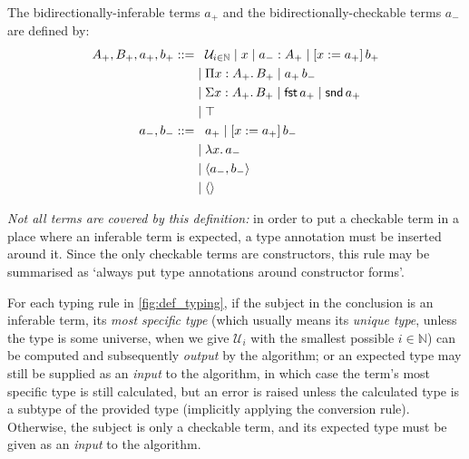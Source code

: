 \documentclass[twoside]{report}
\begin{document}
\begin{definition}
    \label{def:bidirectional_terms}
    The bidirectionally-inferable terms $a_+$ and the bidirectionally-checkable terms $a_-$ are defined by: $$
        \begin{aligned}
            A_+,B_+,a_+,b_+ ::=
             & \phantom{{}\mid{}} \mathcal U_{i \in \mathbb N} \mid x \mid {a_-} : {A_+} \mid \llet x {a_+} {b_+} \\
             & \mid \ppi x {A_+} {B_+} \mid \app {a_+} {b_-}                                                      \\
             & \mid \sig x {A_+} {B_+} \mid \fst {a_+} \mid \snd {a_+}                                            \\
             & \mid \unit                                                                                         \\
            a_-,b_- ::=
             & \phantom{{}\mid{}} a_+ \mid \llet x {a_+} {b_-}                                                    \\
             & \mid \lam x {a_-}                                                                                  \\
             & \mid \pair {a_-} {b_-}                                                                             \\
             & \mid \sstar                                                                                        \\
        \end{aligned}
    $$
\end{definition}

\emph{Not all terms are covered by this definition:} in order to put a checkable term in a place where an inferable term is expected, a type annotation must be inserted around it. Since the only checkable terms are constructors, this rule may be summarised as `always put type annotations around constructor forms'.

For each typing rule in \cref{fig:def_typing}, if the subject in the conclusion is an inferable term, its \emph{most specific type} (which usually means its \emph{unique type}, unless the type is some universe, when we give $\mathcal U_i$ with the smallest possible $i\in\mathbb N$) can be computed and subsequently \emph{output} by the algorithm; or an expected type may still be supplied as an \emph{input} to the algorithm, in which case the term's most specific type is still calculated, but an error is raised unless the calculated type is a subtype of the provided type (implicitly applying the conversion rule). Otherwise, the subject is only a checkable term, and its expected type must be given as an \emph{input} to the algorithm.
\end{document}
